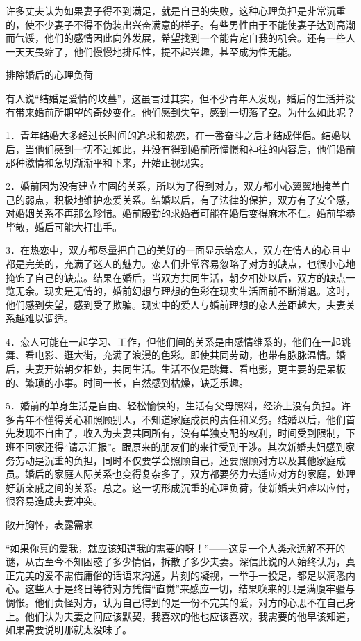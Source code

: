 \documentclass[12pt,UTF8,openany]{ctexbook}
\begin{document}
许多丈夫认为如果妻子得不到满足，就是自己的失败，这种心理负担是非常沉重的，使不少妻子不得不伪装出兴奋满意的样子。有些男性由于不能使妻子达到高潮而气馁，他们的感情因此向外发展，希望找到一个能肯定自我的机会。还有一些人一天天畏缩了，他们慢慢地排斥性，提不起兴趣，甚至成为性无能。





排除婚后的心理负荷


有人说“结婚是爱情的坟墓”，这虽言过其实，但不少青年人发现，婚后的生活并没有带来婚前所期望的奇妙变化。他们感到失望，感到一切落了空。为什么如此呢？

1．青年结婚大多经过长时间的追求和热恋，在一番奋斗之后才结成伴侣。结婚以后，当他们感到一切不过如此，并没有得到婚前所憧憬和神往的内容后，他们婚前那种激情和急切渐渐平和下来，开始正视现实。

2．婚前因为没有建立牢固的关系，所以为了得到对方，双方都小心翼翼地掩盖自己的弱点，积极地维护恋爱关系。结婚以后，有了法律的保护，双方有了安全感，对婚姻关系不再那么珍惜。婚前殷勤的求婚者可能在婚后变得麻木不仁。婚前毕恭毕敬，婚后可能大打出手。

3．在热恋中，双方都尽量把自己的美好的一面显示给恋人，双方在情人的心目中都是完美的，充满了迷人的魅力。恋人们非常容易忽略了对方的缺点，也很小心地掩饰了自己的缺点。结果在婚后，当双方共同生活，朝夕相处以后，双方的缺点一览无余。现实是无情的，婚前幻想与理想的色彩在现实生活面前不断消退。这时，他们感到失望，感到受了欺骗。现实中的爱人与婚前理想的恋人差距越大，夫妻关系越难以调适。

4．恋人可能在一起学习、工作，但他们间的关系是由感情维系的，他们在一起跳舞、看电影、逛大街，充满了浪漫的色彩。即使共同劳动，也带有脉脉温情。婚后，夫妻开始朝夕相处，共同生活。生活不仅是跳舞、看电影，更主要的是呆板的、繁琐的小事。时间一长，自然感到枯燥，缺乏乐趣。

5．婚前的单身生活是自由、轻松愉快的，生活有父母照料，经济上没有负担。许多青年不懂得关心和照顾别人，不知道家庭成员的责任和义务。结婚以后，他们首先发现不自由了，收入为夫妻共同所有，没有单独支配的权利，时间受到限制，下班不回家还得“请示汇报”。跟原来的朋友们的来往受到干涉。其次新婚夫妇感到家务劳动是沉重的负担，同时不仅要学会照顾自己，还要照顾对方以及其他家庭成员。婚后的家庭人际关系也变得复杂多了，双方都要努力去适应对方的家庭，处理好新亲戚之间的关系。总之。这一切形成沉重的心理负荷，使新婚夫妇难以应付，很容易造成夫妻冲突。





敞开胸怀，表露需求


“如果你真的爱我，就应该知道我的需要的呀！”——这是一个人类永远解不开的谜，从古至今不知困惑了多少情侣，拆散了多少夫妻。深信此说的人始终认为，真正完美的爱不需借庸俗的话语来沟通，片刻的凝视，一举手一投足，都足以洞悉内心。这些人于是终日等待对方凭借“直觉”来感应一切，结果唤来的只是满腹牢骚与惆怅。他们责怪对方，认为自己得到的是一份不完美的爱，对方的心思不在自己身上。他们认为夫妻之间应该默契，我喜欢的他也应该喜欢，我需要的他早该知道，如果需要说明那就太没味了。
\end{document}

